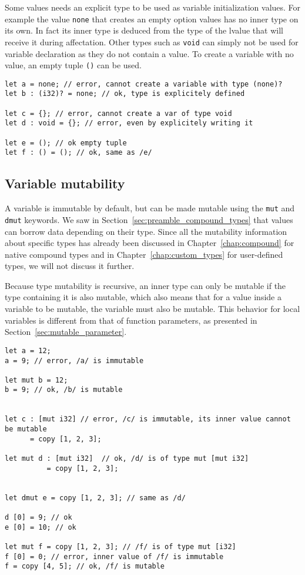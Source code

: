 Some values needs an explicit type to be used as variable initialization values. For example the value \texttt{none} that creates an empty option values has no inner type on its own. In fact its inner type is deduced from the type of the lvalue that will receive it during affectation. Other types such as \texttt{void} can simply not be used for variable declaration as they do not contain a value. To create a variable with no value, an empty tuple \texttt{()} can be used.

\begin{lstlisting}[style=coloredverbatim]
let a = none; // error, cannot create a variable with type (none)?
let b : (i32)? = none; // ok, type is explicitely defined

let c = {}; // error, cannot create a var of type void
let d : void = {}; // error, even by explicitely writing it

let e = (); // ok empty tuple
let f : () = (); // ok, same as /e/
\end{lstlisting}

\subsection {Variable mutability}

A variable is immutable by default, but can be made mutable using the
\texttt{mut} and \texttt{dmut} keywords. We saw in
Section~\ref{sec:preamble_compound_types} that values can borrow data depending
on their type. Since all the mutability information about specific types has
already been discussed in Chapter~\ref{chap:compound} for native compound types
and in Chapter~\ref{chap:custom_types} for user-defined types, we will not
discuss it further.

Because type mutability is recursive, an inner type can only be mutable if the
type containing it is also mutable, which also means that for a value inside a
variable to be mutable, the variable must also be mutable. This behavior for
local variables is different from that of function parameters, as presented in
Section~\ref{sec:mutable_parameter}.

\begin{lstlisting}[style=coloredverbatim]
let a = 12;
a = 9; // error, /a/ is immutable

let mut b = 12;
b = 9; // ok, /b/ is mutable


let c : [mut i32] // error, /c/ is immutable, its inner value cannot be mutable
      = copy [1, 2, 3];

let mut d : [mut i32]  // ok, /d/ is of type mut [mut i32]
          = copy [1, 2, 3];


let dmut e = copy [1, 2, 3]; // same as /d/

d [0] = 9; // ok
e [0] = 10; // ok

let mut f = copy [1, 2, 3]; // /f/ is of type mut [i32]
f [0] = 0; // error, inner value of /f/ is immutable
f = copy [4, 5]; // ok, /f/ is mutable
\end{lstlisting}

